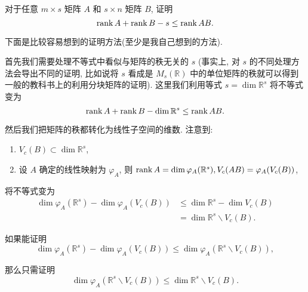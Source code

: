 \documentclass[color=black,device=normal,lang=cn,mode=geye]{elegantnote}
\begin{document}
\begin{exercise}\label{ex3.8}
    对于任意 $m\times s$ 矩阵 $A$ 和 $s\times n$ 矩阵 $B$, 证明
    \[\operatorname{rank} A+\operatorname{rank} B-s\leq\operatorname{rank}  AB.\]
\end{exercise}
下面是比较容易想到的证明方法(至少是我自己想到的方法).
\begin{thought}
    首先我们需要处理不等式中看似与矩阵的秩无关的 $s$ (事实上, 对 $s$ 的不同处理方法会导出不同的证明, 比如说将 $s$ 看成是 $M_s(\mathbb{R})$ 中的单位矩阵的秩就可以得到一般的教科书上的利用分块矩阵的证明). 这里我们利用等式 $s=\dim\mathbb{R}^s$ 将不等式变为
    \[\operatorname{rank} A+\operatorname{rank} B-\dim\mathbb{R}^s\leq\operatorname{rank}  AB.\]

    然后我们把矩阵的秩都转化为线性子空间的维数. 注意到:
    \begin{enumerate}
        \item $V_c(B)\subset\dim\mathbb{R}^s$,
        \item 设 $A$ 确定的线性映射为 $\varphi_A$, 则 $\operatorname{rank} A=\dim\varphi_A(\mathbb{R}^s),V_c(AB)=\varphi_A(V_c(B))$,
    \end{enumerate}

    将不等式变为
    \begin{align*}
        \dim\varphi_A(\mathbb{R}^s)-\dim\varphi_A(V_c(B)) & \leq\dim\mathbb{R}^s-\dim V_c(B) \\
        & =\dim\mathbb{R}^s\backslash V_c(B).
    \end{align*}

    如果能证明
    \[\dim\varphi_A(\mathbb{R}^s)-\dim\varphi_A(V_c(B))\leq\dim\varphi_A(\mathbb{R}^s\backslash V_c(B)),\]

    那么只需证明
    \[\dim\varphi_A(\mathbb{R}^s\backslash V_c(B))\leq\dim\mathbb{R}^s\backslash V_c(B).\]
\end{thought}
\end{document}
